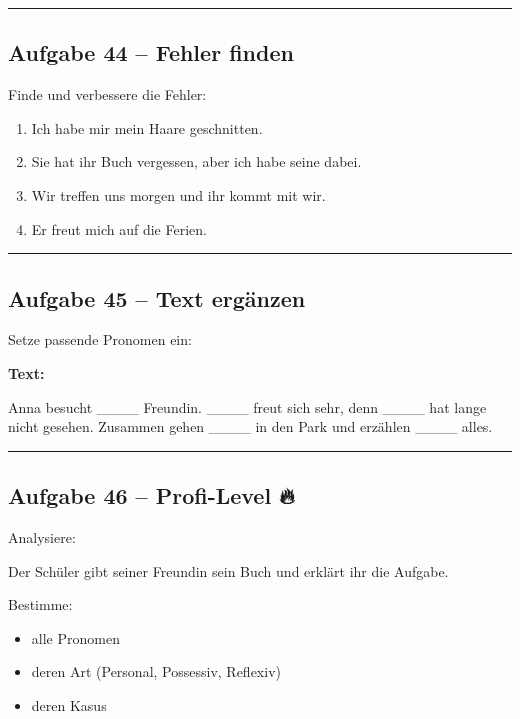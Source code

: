 \documentclass[a4paper,12pt]{article}
\newcommand{\linie}{\vspace{4pt}\hrule\vspace{10pt}}
\begin{document}
\linie

\subsection*{Aufgabe 44 – Fehler finden}

Finde und verbessere die Fehler:

\begin{enumerate}
\item Ich habe mir mein Haare geschnitten.
\item Sie hat ihr Buch vergessen, aber ich habe seine dabei.
\item Wir treffen uns morgen und ihr kommt mit wir.
\item Er freut mich auf die Ferien.
\end{enumerate}

\linie

\subsection*{Aufgabe 45 – Text ergänzen}

Setze passende Pronomen ein:

\textbf{Text:}

Anna besucht \_\_\_\_ Freundin.  
\_\_\_\_ freut sich sehr, denn \_\_\_\_ hat lange nicht gesehen.  
Zusammen gehen \_\_\_\_ in den Park und erzählen \_\_\_\_ alles.

\vspace{15pt}

\linie

\subsection*{Aufgabe 46 – Profi-Level 🔥}

Analysiere:

Der Schüler gibt seiner Freundin sein Buch und erklärt ihr die Aufgabe.

Bestimme:
\begin{itemize}
\item alle Pronomen
\item deren Art (Personal, Possessiv, Reflexiv)
\item deren Kasus
\end{itemize}
\end{document}
